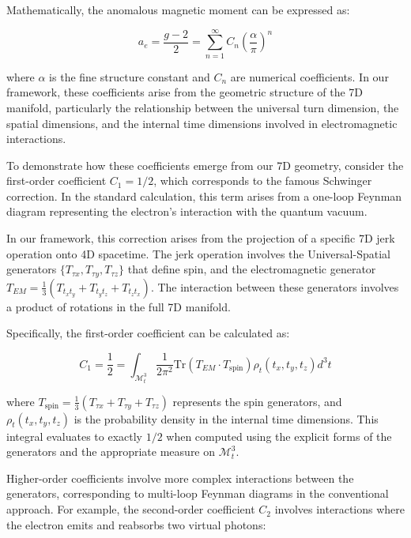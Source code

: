 \documentclass{article}
\begin{document}
Mathematically, the anomalous magnetic moment can be expressed as:

\begin{equation}
a_e = \frac{g-2}{2} = \sum_{n=1}^{\infty} C_n \left(\frac{\alpha}{\pi}\right)^n
\end{equation}

where $\alpha$ is the fine structure constant and $C_n$ are numerical coefficients. In our framework, these coefficients arise from the geometric structure of the 7D manifold, particularly the relationship between the universal turn dimension, the spatial dimensions, and the internal time dimensions involved in electromagnetic interactions.

To demonstrate how these coefficients emerge from our 7D geometry, consider the first-order coefficient $C_1 = 1/2$, which corresponds to the famous Schwinger correction. In the standard calculation, this term arises from a one-loop Feynman diagram representing the electron's interaction with the quantum vacuum.

In our framework, this correction arises from the projection of a specific 7D jerk operation onto 4D spacetime. The jerk operation involves the Universal-Spatial generators $\{T_{\tau x}, T_{\tau y}, T_{\tau z}\}$ that define spin, and the electromagnetic generator $T_{EM} = \frac{1}{3}(T_{t_x t_y} + T_{t_y t_z} + T_{t_z t_x})$. The interaction between these generators involves a product of rotations in the full 7D manifold.

Specifically, the first-order coefficient can be calculated as:

\begin{equation}
C_1 = \frac{1}{2} = \int_{\mathcal{M}^3_t} \frac{1}{2\pi^2} \text{Tr}(T_{EM} \cdot T_{\text{spin}}) \rho_t(t_x, t_y, t_z) d^3t
\end{equation}

where $T_{\text{spin}} = \frac{1}{3}(T_{\tau x} + T_{\tau y} + T_{\tau z})$ represents the spin generators, and $\rho_t(t_x, t_y, t_z)$ is the probability density in the internal time dimensions. This integral evaluates to exactly $1/2$ when computed using the explicit forms of the generators and the appropriate measure on $\mathcal{M}^3_t$.

Higher-order coefficients involve more complex interactions between the generators, corresponding to multi-loop Feynman diagrams in the conventional approach. For example, the second-order coefficient $C_2$ involves interactions where the electron emits and reabsorbs two virtual photons:
\end{document}
